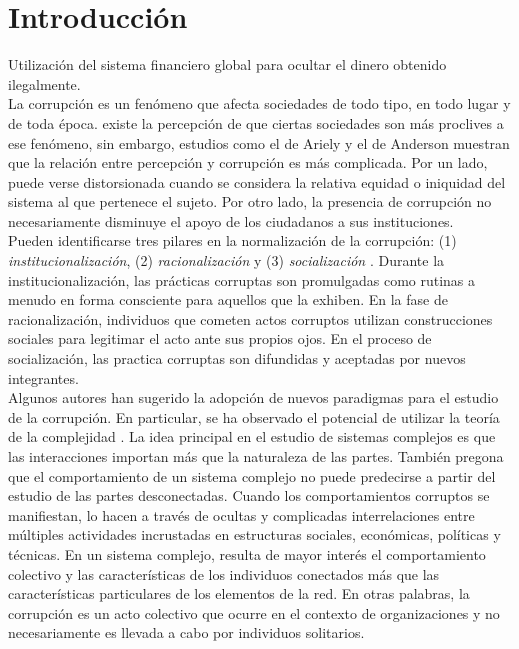 \chapter{Introducción}



Utilización del sistema financiero global para ocultar el dinero obtenido ilegalmente. \cite{granados2022geometry}\\

La corrupción es un fenómeno que afecta sociedades de todo tipo, en todo lugar y de toda época. existe la percepción de que ciertas sociedades son más proclives a ese fenómeno, sin embargo, estudios como el de Ariely  \cite{ariely2017corruption} y el de Anderson \cite{anderson2003corruption} muestran que la relación entre percepción y corrupción es más complicada. Por un lado, puede verse distorsionada cuando se considera la relativa equidad o iniquidad del sistema al que pertenece el sujeto. Por otro lado, la presencia de corrupción no necesariamente disminuye el apoyo de los ciudadanos a sus instituciones.\\

Pueden identificarse tres pilares en la normalización de la corrupción: (1) \textit{institucionalización}, (2) \textit{racionalización} y (3) \textit{socialización} \cite{ashforth2003normalization}. Durante la institucionalización, las prácticas corruptas son promulgadas como rutinas a menudo en forma consciente para aquellos que la exhiben. En la fase de racionalización, individuos que cometen actos corruptos utilizan construcciones sociales para legitimar el acto ante sus propios ojos. En el proceso de socialización, las practica corruptas son difundidas y aceptadas por nuevos integrantes.\\

Algunos autores han sugerido la adopción de nuevos paradigmas para el estudio de la corrupción. En particular, se ha observado el potencial de utilizar la teoría de la complejidad \cite{nicolas2021corruptomics}.  La idea principal en el estudio de sistemas complejos es que las interacciones importan más que la naturaleza de las partes. También pregona que el comportamiento de un sistema complejo no puede predecirse a partir del estudio de las partes desconectadas. Cuando los comportamientos corruptos se manifiestan, lo hacen a través de ocultas y complicadas interrelaciones entre múltiples actividades incrustadas en estructuras sociales, económicas, políticas y técnicas. En un sistema complejo, resulta de mayor interés el comportamiento colectivo y las características de los individuos conectados más que las características particulares de los elementos de la red. En otras palabras, la corrupción es un acto colectivo que ocurre en el contexto de organizaciones \cite{ashforth2003normalization} y no necesariamente es llevada a cabo por individuos solitarios.\\


